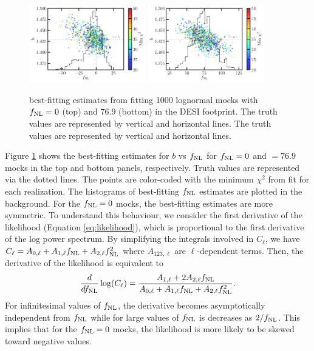 \begin{figure}
    \centering    \includegraphics[width=0.45\textwidth]{figures/bestfit_zero.pdf} 
    \includegraphics[width=0.45\textwidth]{figures/bestfit_po100.pdf}         
    \caption{best-fitting estimates from fitting 1000 lognormal mocks with $f_{\rm NL}=0$ (top) and $76.9$ (bottom) in the DESI footprint. The truth values are represented by vertical and horizontal lines. The truth values are represented by vertical and horizontal lines.}\label{fig:bestfit_mocks}
\end{figure}


Figure \ref{fig:bestfit_mocks} shows the best-fitting estimates for $b$ vs $f_{\rm NL}$ for $f_{\rm NL}=0$ and $=76.9$ mocks in the top and bottom panels, respectively. Truth values are represented via the dotted lines. The points are color-coded with the minimum $\chi^{2}$ from fit for each realization. The histograms of best-fitting $f_{\rm NL}$ estimates are plotted in the background. For the $f_{\rm NL}=0$ mocks, the best-fitting estimates are more symmetric. To understand this behaviour, we consider the first derivative of the likelihood (Equation \ref{eq:likelihood}), which is proportional to the first derivative of the log power spectrum. By simplifying the integrals involved in $C_{\ell}$, we have $C_{\ell} = A_{0, \ell} + A_{1,\ell} f_{\rm NL} + A_{2, \ell} f_{\rm NL}^{2}$ where $A_{123,\ell}$ are $\ell$-dependent terms. Then, the derivative of the likelihood is equivalent to
\begin{equation}
    \frac{d}{df_{\rm NL}}\log(C_{\ell}) = \frac{A_{1, \ell}+2A_{2, \ell}f_{\rm NL}}{A_{0, \ell} + A_{1,\ell} f_{\rm NL} + A_{2, \ell} f_{\rm NL}^{2}}.
\end{equation}
For infinitesimal values of $f_{\rm NL}$, the derivative becomes asymptotically independent from $f_{\rm NL}$ while for large values of $f_{\rm NL}$ is decreases as $2/f_{\rm NL}$. This implies that for the $f_{\rm NL}=0$ mocks, the likelihood is more likely to be skewed toward negative values.

